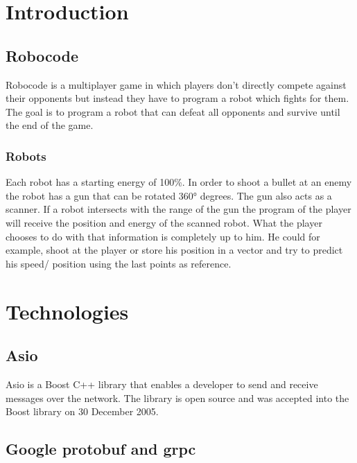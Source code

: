 \documentclass[12pt]{report}
\begin{document}

\tableofcontents
\pagebreak

\renewcommand{\thesection}{\arabic{section}}
\section{Introduction}
 
\subsection{Robocode}

Robocode is a multiplayer game in which players don't directly compete against their opponents but instead they have to program a robot which fights for them. The goal is to program a robot that can defeat all opponents and survive until the end of the game.

\subsubsection{Robots}
Each robot has a starting energy of 100\%. In order to shoot a bullet at an enemy the robot has a gun that can be rotated 360° degrees. The gun also acts as a scanner. If a robot intersects with the range of the gun the program of the player will receive the position and energy of the scanned robot. What the player chooses to do with that information is completely up to him. He could for example, shoot at the player or store his position in a vector and try to predict his speed/ position using the last points as reference.

\section{Technologies}

\subsection{Asio}

Asio is a Boost C++ library that enables a developer to send and receive messages over the network. The library is open source and was accepted into the Boost library on 30 December 2005.

\subsection{Google protobuf and grpc}
\end{document}
